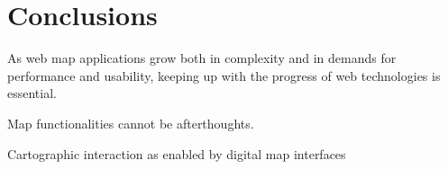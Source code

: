 \section{Conclusions}

As web map applications grow both in complexity and in demands for performance and usability,
keeping up with the progress of web technologies is essential.

Map functionalities cannot be afterthoughts.

Cartographic interaction as enabled by digital map interfaces
